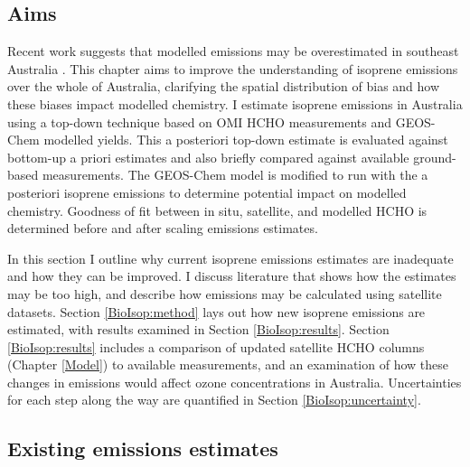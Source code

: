   \subsection{Aims}
    \label{BioIsop:intro:aims}
    
    Recent work suggests that modelled emissions may be overestimated in southeast Australia \parencite{Emmerson2016}.
    This chapter aims to improve the understanding of isoprene emissions over the whole of Australia, clarifying the spatial distribution of bias and how these biases impact modelled chemistry.
    I estimate isoprene emissions in Australia using a top-down technique based on OMI HCHO measurements and GEOS-Chem modelled yields.
    This a posteriori top-down estimate is evaluated against bottom-up a priori estimates and also briefly compared against available ground-based measurements.
    The GEOS-Chem model is modified to run with the a posteriori isoprene emissions to determine potential impact on modelled chemistry.
    Goodness of fit between in situ, satellite, and modelled HCHO is determined before and after scaling emissions estimates.
    
    
    In this section I outline why current isoprene emissions estimates are inadequate and how they can be improved.
    I discuss literature that shows how the estimates may be too high, and describe how emissions may be calculated using satellite datasets.
    Section \ref{BioIsop:method} lays out how new isoprene emissions are estimated, with results examined in Section \ref{BioIsop:results}. 
    Section \ref{BioIsop:results} includes a comparison of updated satellite HCHO columns (Chapter \ref{Model}) to available measurements, and an examination of how these changes in emissions would affect ozone concentrations in Australia.
    Uncertainties for each step along the way are quantified in Section \ref{BioIsop:uncertainty}.
    
    
  \subsection{Existing emissions estimates}
    

